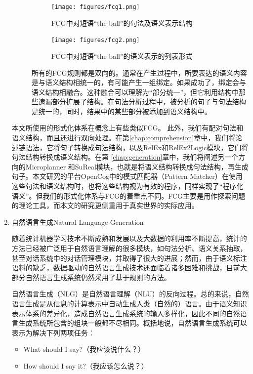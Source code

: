 \begin{enumerate}
\begin{description}
\begin{figure}[htb]
\centering
\texttt{[image: figures/fcg1.png]}
\caption{ FCG中对短语“the ball”的句法及语义表示结构}
\label{fig:fcg1}
\end{figure}

\begin{figure}[htb]
\centering
\texttt{[image: figures/fcg2.png]}
\caption{ FCG中对短语“the ball”的语义表示的列表形式}
\label{fig:fcg2}
\end{figure}


所有的FCG规则都是双向的。通常在产生过程中，所要表达的语义内容是与语义结构相统一的，有可能产生一组绑定。如果成功了，绑定会与语义结构相融合。这种融合可以理解为“部分统一”，但它利用结构中那些遗漏部分扩展了结构。在句法分析过程中，被分析的句子与句法结构是统一的，同时，结果中的某些部分被添加到语义结构中。
\end{description}

本文所使用的形式化体系在概念上有些类似FCG。 此外，我们有配对句法和语义结构，而且还进行双向处理。在第\ref{chap:comprehension}章中，我们将论述链语法，它将句子转换成句法结构，以及RelEx和RelEx2Logic模块，它们将句法结构转换成语义结构。在第 \ref{chap:generation}章中，我们将阐述另一个方向的Microplanner 和SuReal模块，也就是将语义结构转换成句法结构，再生成句子。本文研究的平台OpenCog中的模式匹配器（Pattern Matcher）在使用这些句法和语义结构时，也将这些结构视为有效的程序，同样实现了“程序化语义”。但我们的形式化体系与FCG的着重点不同。FCG主要是用作探索问题的理论工具，而本文的研究更侧重用于真实世界的实际应用。

\item{自然语言生成}{Natural Language Generation}

随着统计机器学习技术不断成熟和发展以及大数据的利用率不断提高，统计的方法已经被广泛用于自然语言理解的很多模块，如句法分析、语义关系抽取，甚至对话系统中的对话管理模块，并取得了很大的进展；然而，由于语义标注语料的缺乏，数据驱动的自然语言生成技术还面临着诸多困难和挑战，目前大部分自然语言生成系统仍然采用了基于规则的方法\cite{Cheyer2007, Mirkovic2011}。

自然语言生成（NLG）是自然语言理解（NLU）的反向过程。总的来说，自然语言生成是从信息的计算表示中自动生成人类（自然的）语言。由于语义知识表示体系的差异化，造成自然语言生成系统的输入多样化，因此不同的自然语言生成系统所包含的组块一般都不尽相同。概括地说，自然语言生成系统可以表示为解决下列两项任务：

\begin{itemize}
\item What should I say?（我应该说什么？）
\item How should I say it?（我应该怎么说？）
\end{itemize}


\end{enumerate}
